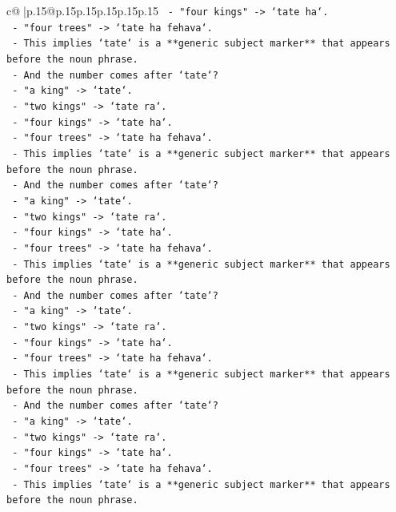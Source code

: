 \documentclass{article}
\begin{document}
{\begin{supertabular}{c@{$\;$}|p{.15\linewidth}@{}p{.15\linewidth}p{.15\linewidth}p{.15\linewidth}p{.15\linewidth}p{.15\linewidth}}
{{{\texttt{    {-} "four kings" {-}> `tate ha`.} \\
\texttt{    {-} "four trees" {-}> `tate ha fehava`.} \\
\texttt{    {-} This implies `tate` is a **generic subject marker** that appears before the noun phrase.} \\
\texttt{    {-} And the number comes after `tate`?} \\
\texttt{    {-} "a king" {-}> `tate`.} \\
\texttt{    {-} "two kings" {-}> `tate ra`.} \\
\texttt{    {-} "four kings" {-}> `tate ha`.} \\
\texttt{    {-} "four trees" {-}> `tate ha fehava`.} \\
\texttt{    {-} This implies `tate` is a **generic subject marker** that appears before the noun phrase.} \\
\texttt{    {-} And the number comes after `tate`?} \\
\texttt{    {-} "a king" {-}> `tate`.} \\
\texttt{    {-} "two kings" {-}> `tate ra`.} \\
\texttt{    {-} "four kings" {-}> `tate ha`.} \\
\texttt{    {-} "four trees" {-}> `tate ha fehava`.} \\
\texttt{    {-} This implies `tate` is a **generic subject marker** that appears before the noun phrase.} \\
\texttt{    {-} And the number comes after `tate`?} \\
\texttt{    {-} "a king" {-}> `tate`.} \\
\texttt{    {-} "two kings" {-}> `tate ra`.} \\
\texttt{    {-} "four kings" {-}> `tate ha`.} \\
\texttt{    {-} "four trees" {-}> `tate ha fehava`.} \\
\texttt{    {-} This implies `tate` is a **generic subject marker** that appears before the noun phrase.} \\
\texttt{    {-} And the number comes after `tate`?} \\
\texttt{    {-} "a king" {-}> `tate`.} \\
\texttt{    {-} "two kings" {-}> `tate ra`.} \\
\texttt{    {-} "four kings" {-}> `tate ha`.} \\
\texttt{    {-} "four trees" {-}> `tate ha fehava`.} \\
\texttt{    {-} This implies `tate` is a **generic subject marker** that appears before the noun phrase.} \\
}}}
\end{supertabular}}
\end{document}
